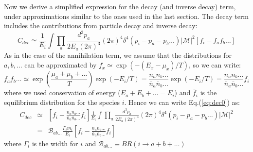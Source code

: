 \documentclass[preprint,notoc]{JHEP3}
\def\to{\rightarrow}
\def\to{\rightarrow}
\begin{document}
Now we derive a simplified expression for the decay (and inverse decay) term,
under approximations similar to the ones used in the last section.
The decay term includes the contributions from particle decay and inverse
decay\cite{kawasaki0,kawasaki}:
\begin{equation}
C_{dec} \simeq \frac{1}{E_i} \int \prod_{a} \frac{d^3 p_a}{2 E_a (2 \pi)^3}
(2 \pi)^4 \delta^{4}\left(p_i - p_a - p_b \ldots\right) |\mathcal{M}|^2 \left[f_i - f_a f_b \ldots \right]
\label{eq:dec0}
\end{equation}
As in the case of the annihilation term, we assume that the distributions for
$a,b,\ldots$ can be approximated by $f_x \simeq \exp(-(E_x -
\mu_x)/T)$, so we can write:
\begin{equation}
f_a f_b \ldots \simeq \exp\left(\frac{\mu_a +
\mu_b + \ldots}{T}\right) \exp(-E_i/T) = \frac{n_a n_b \ldots}{\bar{n}_a
\bar{n}_b \ldots} \exp(-E_i/T)  =  \frac{n_a n_b \ldots}{\bar{n}_a \bar{n}_b \ldots}
\bar{f}_{i}
\end{equation}
where we used conservation of energy ($E_a + E_b + \ldots = E_i$) and
$\bar{f}_i$ is the equilibrium distribution for the species $i$.
Hence we can write Eq.(\ref{eq:dec0}) as:
\begin{eqnarray}
C_{dec} & \simeq & \left[f_i - \frac{n_a n_b \ldots}{\bar{n}_a \bar{n}_b \ldots}
\bar{f}_{i} \right] \frac{1}{E_i} \int \prod_{a}
\frac{d^3 p_a}{2 E_a (2 \pi)^3} (2 \pi)^4 \delta^{4}\left(p_i - p_a - p_b
\ldots\right) |\mathcal{M}|^2 \nonumber \\
& = & \mathcal{B}_{ab\ldots} \frac{\Gamma_i m_i}{E_i} \left[f_i -
\frac{n_a n_b \ldots}{\bar{n}_a \bar{n}_b \ldots} \bar{f}_{i} \right] 
\end{eqnarray}
where $\Gamma_i$ is the width for $i$ and 
$\mathcal{B}_{ab\ldots} \equiv BR(i \to a + b + \ldots)$
\end{document}
